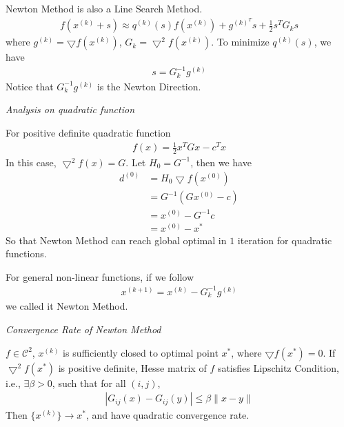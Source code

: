 \documentclass[runningheads]{llncs}
\begin{document}
Newton Method is also a Line Search Method.
\begin{align}
    f(x^{(k)} + s) \approx q^{(k)}(s) f(x^{(k)}) + g^{(k)^T} s
     + \frac{1}{2} s^T G_k s
\end{align}
where $g^{(k)} = \bigtriangledown f(x^{(k)})$,
$G_k = \bigtriangledown^2 f(x^{(k)})$.
To minimize $q^{(k)}(s)$, we have
\begin{align}
    s = G_k^{-1} g^{(k)}
\end{align}
Notice that $G_k^{-1} g^{(k)}$ is the Newton Direction.
\par
\vspace{.3em}
\noindent\textit{Analysis on quadratic function}
\par
For positive definite quadratic function
\begin{align}
    f(x) = \frac{1}{2} x^TGx - c^Tx
\end{align}
In this case, $\bigtriangledown^2 f(x) = G$.
Let $H_0 = G^{-1}$, then we have
\begin{align}
    d^{(0)} &= H_0 \bigtriangledown f(x^{(0)}) \\
    &= G^{-1} (Gx^{(0)} - c) \\
    &= x^{(0)} - G^{-1}c \\
    &= x^{(0)} - x^*
\end{align}
So that Newton Method can reach global optimal
in $1$ iteration for quadratic functions.
\par
For general non-linear functions, if we follow
\begin{align}
    x^{(k+1)} = x^{(k)} - G_k^{-1} g^{(k)}
\end{align}
we called it Newton Method.
\par
\vspace{.3em}
\noindent\textit{Convergence Rate of Newton Method}
\begin{theorem}
    $f \in \mathcal{C}^2$, $x^{(k)}$ is sufficiently closed
    to optimal point $x^*$, where $\bigtriangledown f(x^*) = 0$.
    If $\bigtriangledown^2 f(x^*)$ is positive definite, 
    Hesse matrix of $f$ satisfies Lipschitz Condition, i.e.,
    $\exists \beta >0$, such that for all $(i, j)$,
    \begin{align}
        | G_{ij}(x) - G_{ij}(y)| \leq \beta \parallel x - y \parallel
    \end{align}
    Then $\{x^{(k)}\} \rightarrow x^*$, and have quadratic
    convergence rate.
\end{theorem}
\end{document}
